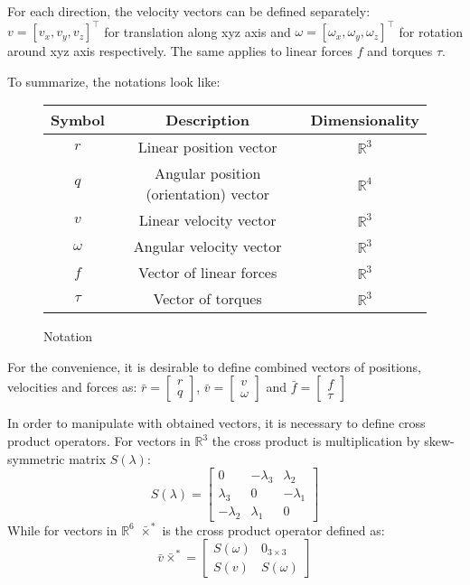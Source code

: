     For each direction, the velocity vectors can be defined separately: 
    $v = [v_x, v_y, v_z]^\top$ for translation along xyz axis and
    $\omega = [\omega_x, \omega_y, \omega_z]^\top$ for rotation around xyz axis respectively.
    The same applies to linear forces $f$ and torques $\tau$.

    To summarize, the notations look like:

    \begin{figure}[H]
    \begin{tabular}{ccc}
        \hline Symbol & Description & Dimensionality\\
        \hline
        $r$ & Linear position vector & $\mathbb{R}^{3}$ \\
        $q$ & Angular position (orientation) vector & $\mathbb{R}^{4}$\\
        $v$ & Linear velocity vector & $\mathbb{R}^{3}$\\
        $\omega$ & Angular velocity vector & $\mathbb{R}^{3}$\\
        $f$ & Vector of linear forces& $\mathbb{R}^{3}$ \\
        $\tau$ & Vector of torques& $\mathbb{R}^{3}$ \\
        \hline
        \end{tabular}
        \caption{Notation}
        \label{table:notation}
    \end{figure}

    For the convenience, it is desirable to define combined vectors of positions, velocities and forces as:
    $\bar{r} = \left[\begin{array}{ll}
        r \\
        q
    \end{array}\right]$, $\bar{v} = \left[\begin{array}{ll}
        v \\
        \omega
    \end{array}\right]$ and $\bar{f} = \left[\begin{array}{ll}
        f \\
        \tau
    \end{array}\right]$

    In order to manipulate with obtained vectors, it is necessary to define cross product operators.
    For vectors in $\mathbb{R}^{3}$ the cross product is multiplication by skew-symmetric matrix $S(\lambda)$:
    $$
    S(\lambda)=\left[\begin{array}{ccc}
        0 & -\lambda_3 & \lambda_2 \\
        \lambda_3 & 0 & -\lambda_1 \\
        -\lambda_2 & \lambda_1 & 0
    \end{array}\right]
    $$
    While for vectors in $\mathbb{R}^{6}$ $\bar{\times}^*$ is the cross product operator defined as:
    $$
    \bar{v}\bar{\times}^*=\left[\begin{array}{ll}
        S(\omega) & 0_{3 \times 3} \\
        S(v) & S(\omega)
    \end{array}\right]
    $$

